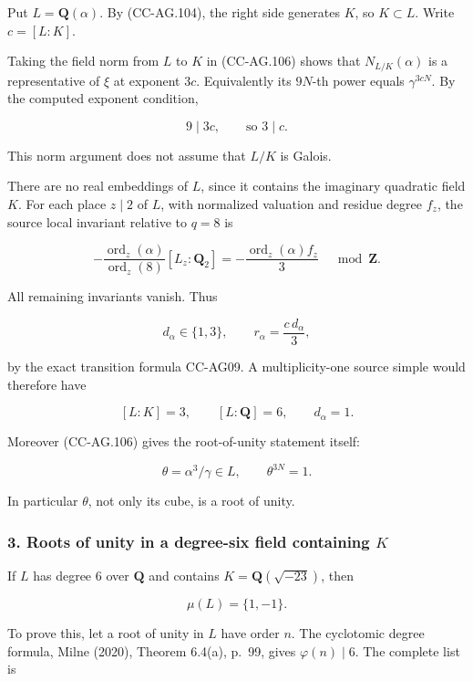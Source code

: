 Put \(L=\mathbf Q(\alpha)\). By (CC-AG.104), the right side generates
\(K\), so \(K\subset L\). Write \(c=[L:K]\).

Taking the field norm from \(L\) to \(K\) in (CC-AG.106) shows that
\(N_{L/K}(\alpha)\) is a representative of \(\xi\) at exponent \(3c\).
Equivalently its \(9N\)-th power equals \(\gamma^{3cN}\). By the
computed exponent condition,

\[
 9\mid3c,\qquad\text{so }3\mid c.
 \tag{CC-AG.107}
\]

This norm argument does not assume that \(L/K\) is Galois.

There are no real embeddings of \(L\), since it contains the imaginary
quadratic field \(K\). For each place \(z\mid2\) of \(L\), with
normalized valuation and residue degree \(f_z\), the source local
invariant relative to \(q=8\) is

\[
 -\frac{\operatorname{ord}_z(\alpha)}
          {\operatorname{ord}_z(8)}[L_z:\mathbf Q_2]
 =-\frac{\operatorname{ord}_z(\alpha) f_z}{3}
 \quad\bmod\mathbf Z.
 \tag{CC-AG.108}
\]

All remaining invariants vanish. Thus

\[
 d_\alpha\in\{1,3\},\qquad
 r_\alpha=\frac{c\,d_\alpha}{3},
 \tag{CC-AG.109}
\]

by the exact transition formula CC-AG09. A multiplicity-one source
simple would therefore have

\[
 [L:K]=3,\qquad [L:\mathbf Q]=6,\qquad d_\alpha=1.
 \tag{CC-AG.110}
\]

Moreover (CC-AG.106) gives the root-of-unity statement itself:

\[
 \theta=\alpha^3/\gamma\in L,\qquad
 \theta^{3N}=1.
 \tag{CC-AG.111}
\]

In particular \(\theta\), not only its cube, is a root of unity.

\subsubsection{\texorpdfstring{3. Roots of unity in a degree-six field
containing
\(K\)}{3. Roots of unity in a degree-six field containing K}}\label{roots-of-unity-in-a-degree-six-field-containing-k}

If \(L\) has degree \(6\) over \(\mathbf Q\) and contains
\(K=\mathbf Q(\sqrt{-23})\), then

\[
 \mu(L)=\{1,-1\}.
 \tag{CC-AG.112}
\]

To prove this, let a root of unity in \(L\) have order \(n\). The
cyclotomic degree formula, Milne (2020), Theorem 6.4(a), p.~99, gives
\(\varphi(n)\mid6\). The complete list is

